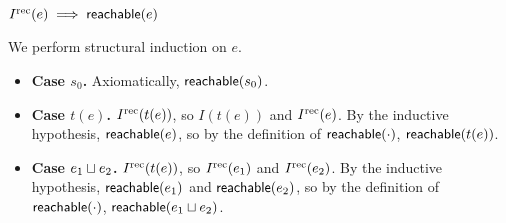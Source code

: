 \begin{claim}
  $I^{\text{rec}}(e) \implies \textsf{reachable}(e)$
\end{claim}
\begin{elidableproof}
  We perform structural induction on $e$.
  \begin{itemize}
    \item \textbf{Case $s_0$.}
      Axiomatically, $\textsf{reachable}(s_0)$.

    \item \textbf{Case $t(e)$.}
      $I^{\text{rec}}(t(e))$, so $I(t(e))$ and $I^{\text{rec}}(e)$. By the inductive hypothesis,
      $\textsf{reachable}(e)$, so by the definition of $\textsf{reachable}(\cdot)$,
      $\textsf{reachable}(t(e))$.

    \item \textbf{Case $e_1 \sqcup e_2$.}
      $I^{\text{rec}}(t(e))$, so $I^{\text{rec}}(e_1)$ and $I^{\text{rec}}(e_2)$. By the inductive
      hypothesis, $\textsf{reachable}(e_1)$ and $\textsf{reachable}(e_2)$, so by the definition
      of $\textsf{reachable}(\cdot)$, $\textsf{reachable}(e_1 \sqcup e_2)$.
  \end{itemize}
\end{elidableproof}

